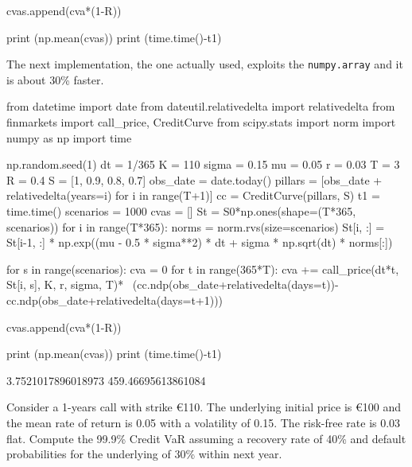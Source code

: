 \begin{solution}
\begin{ipython}
        cvas.append(cva*(1-R))

print (np.mean(cvas))
print (time.time()-t1)
\end{ipython}
\begin{ioutput}
\end{ioutput}
The next implementation, the one actually used, exploits the \texttt{numpy.array} and it is about 30\% faster.

\begin{ipython}
from datetime import date
from dateutil.relativedelta import relativedelta
from finmarkets import call_price, CreditCurve
from scipy.stats import norm
import numpy as np
import time

np.random.seed(1)
dt = 1/365
K = 110
sigma = 0.15
mu = 0.05
r = 0.03
T = 3
R = 0.4
S = [1, 0.9, 0.8, 0.7]
obs_date = date.today()
pillars = [obs_date + relativedelta(years=i) for i in range(T+1)]
cc = CreditCurve(pillars, S)
t1 = time.time()
scenarios = 1000
cvas = []
St = S0*np.ones(shape=(T*365, scenarios))
for i in range(T*365):
    norms = norm.rvs(size=scenarios)
    St[i, :] = St[i-1, :] * np.exp((mu - 0.5 * sigma**2) * dt + sigma
        * np.sqrt(dt) * norms[:])

for s in range(scenarios):
    cva = 0
    for t in range(365*T):
        cva += call_price(dt*t, St[i, s], K, r, sigma, T)* \
            (cc.ndp(obs_date+relativedelta(days=t))-
             cc.ndp(obs_date+relativedelta(days=t+1)))

        cvas.append(cva*(1-R))

print (np.mean(cvas))
print (time.time()-t1)
\end{ipython}
\begin{ioutput}
3.7521017896018973
459.46695613861084
\end{ioutput}
\end{solution}

\begin{question}
Consider a 1-years call with strike \euro{110}. The underlying initial price is \euro{100} and the mean rate of return is 0.05 with a volatility of 0.15. The risk-free rate is 0.03 flat.
Compute the 99.9\% Credit VaR assuming a recovery rate of 40\% and default probabilities for the underlying of 30\% within next year.
\end{question}

